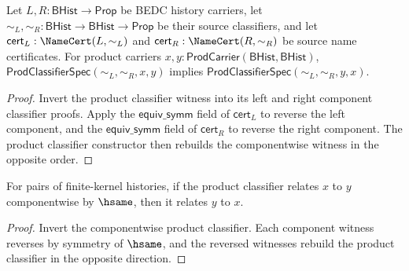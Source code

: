 \begin{theorem}
\label{thm:prod-classifier-symm-from-namecert}
Let $L,R:\mathsf{BHist}\to\mathsf{Prop}$ be BEDC history carriers, let
$\sim_L,\sim_R:\mathsf{BHist}\to\mathsf{BHist}\to\mathsf{Prop}$ be their
source classifiers, and let
$\mathsf{cert}_L:\NameCert(L,\sim_L)$ and
$\mathsf{cert}_R:\NameCert(R,\sim_R)$ be source name certificates. For product
carriers $x,y:\mathsf{ProdCarrier}(\mathsf{BHist},\mathsf{BHist})$,
$\mathsf{ProdClassifierSpec}(\sim_L,\sim_R,x,y)$ implies
$\mathsf{ProdClassifierSpec}(\sim_L,\sim_R,y,x)$.
\end{theorem}
\begin{proof}
Invert the product classifier witness into its left and right component
classifier proofs. Apply the $\mathsf{equiv\_symm}$ field of
$\mathsf{cert}_L$ to reverse the left component, and the
$\mathsf{equiv\_symm}$ field of $\mathsf{cert}_R$ to reverse the right
component. The product classifier constructor then rebuilds the componentwise
witness in the opposite order.
\end{proof}

\begin{theorem}
\label{thm:prod-classifier-hsame-symm}
For pairs of finite-kernel histories, if the product classifier relates \(x\) to \(y\) componentwise by \(\hsame\), then it relates \(y\) to \(x\).
\end{theorem}
\begin{proof}
Invert the componentwise product classifier. Each component witness reverses by symmetry of \(\hsame\), and the reversed witnesses rebuild the product classifier in the opposite direction.
\end{proof}

